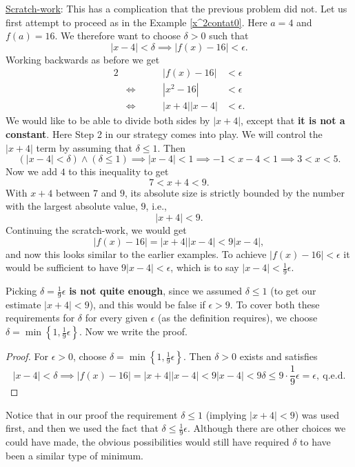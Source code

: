 \underline{Scratch-work}: This has a complication that the previous 
problem did not.  Let us first attempt to proceed as in the
Example \ref{x^2contat0}.  Here $a=4$ and $f(a)=16$. 
We therefore want to choose $\delta>0$ such that
$$|x-4|<\delta\implies|f(x)-16|<\epsilon.$$
Working backwards as before we get
\begin{alignat*}{2}
&&|f(x)-16|&<\epsilon\\
&\iff\qquad&|x^2-16|&<\epsilon\\
&\iff\qquad&|x+4||x-4|&<\epsilon. 
\end{alignat*} 
We would like to be able to divide both sides by $|x+4|$, except
that {\bf it is not a constant}.  Here Step 2 in our 
strategy comes into
play.  We will control the $|x+4|$ term by assuming
that $\delta\le1$.  Then\footnotemark
{}
$$ (|x-4|<\delta)\wedge(\delta\le1)
\implies|x-4|<1\implies-1<x-4<1\implies3<x<5.$$
Now we add $4$ to this inequality to get
$$7<x+4<9.$$
With $x+4$ between $7$ and $9$, its absolute size is strictly
bounded by the number with the largest absolute value, $9$, i.e.,
$$|x+4|<9.$$
Continuing the scratch-work, we would get
$$|f(x)-16|=|x+4||x-4|<9|x-4|,$$
and now this looks similar to the earlier examples.  To achieve
$|f(x)-16|<\epsilon$ it would be sufficient to have $9|x-4|<\epsilon$,
which is to say $|x-4|<\frac19\epsilon$.  

Picking $\delta=\frac19\epsilon$ {\bf is not quite enough}, since we 
assumed $\delta\le1$ (to get our estimate $|x+4|<9$), and
this would be false if $\epsilon>9$.  To cover both
these requirements for $\delta$ for every given $\epsilon$
(as the definition requires),  we choose $\delta=\min\left\{
1,\frac19\epsilon\right\}$.
Now we write the proof.

\begin{proof} For $\epsilon>0$, choose $\delta=
\min\left\{1,\frac19\epsilon\right\}$.  Then $\delta>0$ 
exists and satisfies 
$$|x-4|<\delta\implies
|f(x)-16|=|x+4||x-4|<9|x-4|<9\delta\le9\cdot\frac19\epsilon=\epsilon,
\mathrm{\ q.e.d.}$$
\end{proof}
\eex 
Notice that in our proof 
the requirement $\delta\le1$ (implying $|x+4|<9$)
was used first, and then we used 
the fact that $\delta\le\frac19\epsilon$.  Although there are other
choices we could have made, the obvious possibilities
would still have required $\delta$ to have been a similar type of  minimum. 

